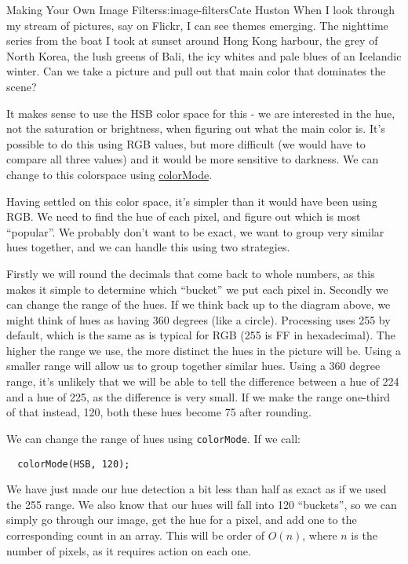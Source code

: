 \begin{aosachapter}{Making Your Own Image Filters}{s:image-filters}{Cate Huston}
When I look through my stream of pictures, say on Flickr, I can see
themes emerging. The nighttime series from the boat I took at sunset
around Hong Kong harbour, the grey of North Korea, the lush greens of
Bali, the icy whites and pale blues of an Icelandic winter. Can we take
a picture and pull out that main color that dominates the scene?

It makes sense to use the HSB color space for this - we are interested
in the hue, not the saturation or brightness, when figuring out what the
main color is. It's possible to do this using RGB values, but more
difficult (we would have to compare all three values) and it would be
more sensitive to darkness. We can change to this colorspace using
\href{http://processing.org/reference/colorMode_.html}{colorMode}.

Having settled on this color space, it's simpler than it would have been
using RGB. We need to find the hue of each pixel, and figure out which
is most ``popular''. We probably don't want to be exact, we want to
group very similar hues together, and we can handle this using two
strategies.

Firstly we will round the decimals that come back to whole numbers, as
this makes it simple to determine which ``bucket'' we put each pixel in.
Secondly we can change the range of the hues. If we think back up to the
diagram above, we might think of hues as having 360 degrees (like a
circle). Processing uses 255 by default, which is the same as is typical
for RGB (255 is FF in hexadecimal). The higher the range we use, the
more distinct the hues in the picture will be. Using a smaller range
will allow us to group together similar hues. Using a 360 degree range,
it's unlikely that we will be able to tell the difference between a hue
of 224 and a hue of 225, as the difference is very small. If we make the
range one-third of that instead, 120, both these hues become 75 after
rounding.

We can change the range of hues using \texttt{colorMode}. If we call:

\begin{verbatim}
  colorMode(HSB, 120);
\end{verbatim}

We have just made our hue detection a bit less than half as exact as if
we used the 255 range. We also know that our hues will fall into 120
``buckets'', so we can simply go through our image, get the hue for a
pixel, and add one to the corresponding count in an array. This will be
order of $O(n)$, where $n$ is the number of pixels, as it requires
action on each one.


\end{aosachapter}

